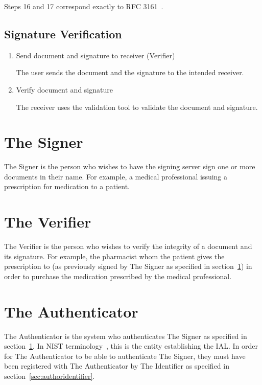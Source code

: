 Steps 16 and 17 correspond exactly to RFC 3161~\cite{rfc3161}.

\subsection{Signature Verification}\label{subsec:signature-verification}
\begin{enumerate}[resume]
    \item Send document and signature to receiver (Verifier)

    The user sends the document and the signature to the intended receiver.

    \item Verify document and signature

    The receiver uses the validation tool to validate the document and signature.
\end{enumerate}

\section{The Signer}
\label{sec:actorsigner}
The Signer is the person who wishes to have the signing server sign one or more documents in their name.
For example, a medical professional issuing a prescription for medication to a patient.

\section{The Verifier}
\label{sec:actorverifier}
The Verifier is the person who wishes to verify the integrity of a document and its signature.
For example, the pharmacist whom the patient gives the prescription to (as previously signed by The Signer as specified in section~\ref{sec:actorsigner}) in order to purchase the medication prescribed by the medical professional.

\section{The Authenticator}
\label{sec:actorauthenticator}
The Authenticator is the system who authenticates The Signer as specified in section~\ref{sec:actorsigner}.
In \gls{NIST} terminology~\cite{nistdigitalidentityguidelines}, this is the entity establishing the \gls{IAL}.
In order for The Authenticator to be able to authenticate The Signer,
they must have been registered with The Authenticator by The Identifier as specified in section~\ref{sec:authoridentifier}.

